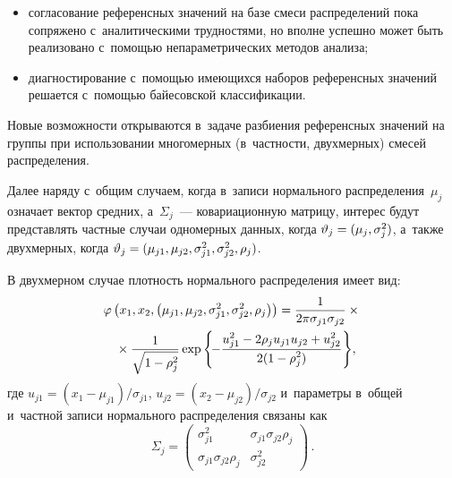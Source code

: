 \begin{multicols}{2}
\begin{itemize}
{}

\item согласование референсных значений на базе смеси распределений
пока сопряжено с~аналитическими трудностями, но вполне успешно может
быть реализовано с~помощью не\-па\-ра\-мет\-ри\-че\-ских методов анализа;\\[-9pt]
\item  диагностирование с~по\-мощью имеющихся наборов
референсных значений решается с~по\-мощью байесовской классификации.
\end{itemize}

     Новые возможности открываются в~задаче разбиения референсных
значений на группы при ис\-поль\-зо\-ва\-нии многомерных (в~частности,
двухмерных) смесей распределения.

Далее наряду
 с~общим случаем,
когда в~записи нормального распределения~$\mu_j$ означает вектор средних,
а~$\Sigma_j$~--- ковариационную матрицу, интерес будут пред\-став\-лять частные
случаи одномерных данных, когда $\vartheta_j\hm= (\mu_j, \sigma_j^2)$,
а~также двухмерных, когда $\vartheta_j\hm= (\mu_{j1}, \mu_{j2}, \sigma_{j1}^2,
\sigma_{j2}^2, \rho_j)$.

     В двухмерном случае плотность нормального распределения имеет вид:
     \begin{multline}
     \varphi\left( x_1,x_2,\left( \mu_{j1}, \mu_{j2}, \sigma_{j1}^2, \sigma_{j2}^2,
\rho_j\right) \right) =\displaystyle\frac{\displaystyle 1\mathstrut}{\displaystyle 2\pi\sigma_{j1}\sigma_{j2}\mathstrut}\times{}\\
{} \times\displaystyle\frac{\displaystyle 1\mathstrut}{\displaystyle \sqrt{1-\rho_j^2}\mathstrut}\exp  \left\{\! -
\displaystyle\frac{\displaystyle u_{j1}^2 -2\rho_j u_{j1} u_{j2} +u_{j2}^2\mathstrut}{\displaystyle 2(1-\rho_j^2)\mathstrut}\right\}\!,\!\!\!
     \label{e2-kri}
     \end{multline}
где $u_{j1}=(x_1-\mu_{j1})/\sigma_{j1}$, $u_{j2}= (x_2-\mu_{j2})/\sigma_{j2}$
и~параметры в~общей и~частной записи нормального распределения связаны как
$$
\Sigma_j= \begin{pmatrix}
\sigma_{j1}^2 & \sigma_{j1} \sigma_{j2} \rho_j\\[3pt]
\sigma_{j1} \sigma_{j2}\rho_j & \sigma_{j2}^2
\end{pmatrix}\,.
$$


\end{multicols}
